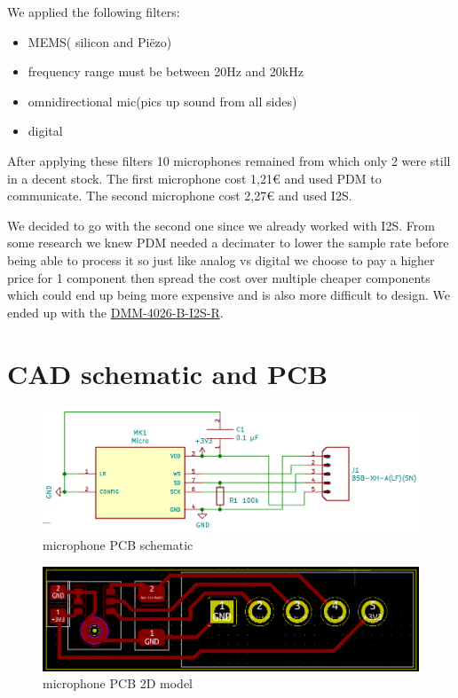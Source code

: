         We applied the following filters:
        \begin{itemize}
            \item MEMS( silicon and Piëzo)
            \item frequency range must be between 20Hz and 20kHz 
            \item omnidirectional mic(pics up sound from all sides)
            \item digital
        \end{itemize}
        After applying these filters 10 microphones remained from which only 2
        were still in a decent stock.
        The first microphone cost 1,21\euro{} and used PDM to communicate.
        The second microphone cost 2,27\euro{} and used I2S.
        
        We decided to go with the second one since we already worked with I2S.
        From some research we knew PDM needed a decimater to lower the sample rate
        before being able to process it so just like analog vs digital we choose 
        to pay a higher price for 1 component then spread the cost over multiple cheaper
        components which could end up being more expensive and is also more difficult to design. We ended up with the \href{https://www.digikey.be/en/products/detail/pui-audio-inc/DMM-4026-B-I2S-R/11587483}{DMM-4026-B-I2S-R}.
        
        
        
        
\section{CAD schematic and PCB}

    \begin{figure}[hb]\centering
         \includegraphics[width=1\textwidth,height=1\textheight,keepaspectratio]{figs/Schematic.PNG}
    	\caption{microphone PCB schematic}\label{fig:radiation}
    \end{figure}
    
    \begin{figure}[hb]\centering
         \includegraphics[width=1\textwidth,height=1\textheight,keepaspectratio]{figs/PCB_2Dmodel.PNG}
    	\caption{microphone PCB 2D model}\label{fig:radiation}
    \end{figure}
    
